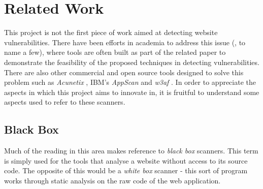 \section{Related Work}

This project is not the first piece of work aimed at detecting website vulnerabilities. There have been efforts in academia to address this issue (\cite{Saner, Waler, Kals:2006:SWV:1135777.1135817, stateAwareBlackBoxWebVulnScanner}, to name a few), where tools are often built as part of the related paper to demonstrate the feasibility of the proposed techniques in detecting vulnerabilities. There are also other commercial and open source tools designed to solve this problem such as \textit{Acunetix} \cite{acunetix}, IBM's \textit{AppScan} \cite{appscan} and \textit{w3af} \cite{w3af}. In order to appreciate the aspects in which this project aims to innovate in, it is fruitful to understand some aspects used to refer to these scanners.

\subsection{Black Box}

Much of the reading in this area makes reference to \textit{black box} scanners. This term is simply used for the tools that analyse a website without access to its source code. The opposite of this would be a \textit{white box} scanner - this sort of program works through static analysis on the raw code of the web application.

